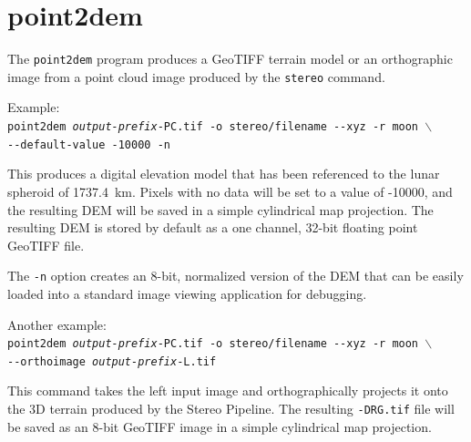 
\section{point2dem}
\label{point2dem}

The \texttt{point2dem} program produces a GeoTIFF terrain model or an orthographic image from a point cloud image produced by the {\tt stereo} command.

Example:\\
\hspace*{2em}\texttt{point2dem \textit{output-prefix}-PC.tif -o stereo/filename -\/-xyz -r moon $\backslash$} \\
\hspace*{4em}\texttt{-\/-default-value -10000 -n}

This produces a digital elevation model that has been referenced to
the lunar spheroid of 1737.4~km.  Pixels with no data will be set to a
value of -10000, and the resulting \ac{DEM} will be saved in a simple
cylindrical map projection.  The resulting \ac{DEM} is stored by default as
a one channel, 32-bit floating point GeoTIFF file.

The {\tt -n} option creates an 8-bit, normalized version of the DEM
that can be easily loaded into a standard image viewing application
for debugging.

Another example: \\
\hspace*{2em}\texttt{point2dem \textit{output-prefix}-PC.tif -o stereo/filename -\/-xyz -r moon $\backslash$} \\
\hspace*{4em}\texttt{-\/-orthoimage \textit{output-prefix}-L.tif}

This command takes the left input image and orthographically projects
it onto the 3D terrain produced by the Stereo Pipeline.  The resulting
{\tt *-DRG.tif} file will be saved as an 8-bit GeoTIFF image in a
simple cylindrical map projection.

